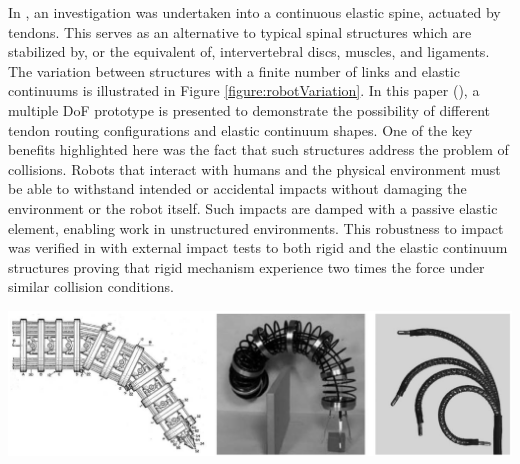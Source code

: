 \documentclass[11pt]{article}
\begin{document}
In \cite{reinecke2016}, an investigation was undertaken into a continuous elastic spine, actuated by tendons. This serves as an alternative to typical spinal structures which are stabilized by, or the equivalent of, intervertebral discs, muscles, and ligaments. The variation between structures with a finite number of links and elastic continuums is illustrated in Figure \ref{figure:robotVariation}. In this paper (\cite{reinecke2016}), a multiple DoF prototype is presented to demonstrate the possibility of different tendon routing configurations and elastic continuum shapes. One of the key benefits highlighted here was the fact that such structures address the problem of collisions. Robots that interact with humans and the physical environment must be able to withstand intended or accidental impacts without damaging the environment or the robot itself. Such impacts are damped with a passive elastic element, enabling work in unstructured environments. This robustness to impact was verified in \cite{reinecke2016} with external impact tests to both rigid and the elastic continuum structures proving that rigid mechanism experience two times the force under similar collision conditions.

\begin{center}
\includegraphics[width=\textwidth]{images/robotVariation.png}
\label{figure:robotVariation}
\end{center}
\end{document}
